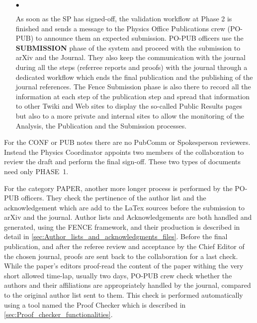 \begin{itemize}
    \item[\tiny$\bullet$]
    
As soon as the SP has signed-off, the validation workflow at Phase 2 is finished and sends a message to the Physics Office Publications crew (PO-PUB) to announce them an expected submission. PO-PUB officers use the \textbf{SUBMISSION} phase of the system and proceed with the submission to arXiv and the Journal. They also keep the communication with the journal during all the steps (referree reports and proofs) with the journal through a dedicated  workflow which ends  the final publication and the publishing of the journal references. The Fence Submission phase is also there to record all the information at each step of the publication step and spread that information to other Twiki and Web sites to display the so-called Public Results pages but also to a more private and internal sites to allow the monitoring of the Analysis, the Publication and the Submission processes.

\end{itemize}

For the CONF or PUB notes there are no PubComm or Spokesperson reviewers. Instead the Physics Coordinator appoints two members of the collaboration to review the draft and perform the final sign-off. These two types of documents need only PHASE~1.

For the category PAPER,  another more longer process is performed by the PO-PUB officers. They check the pertinence of the author list and the acknowledgement which are add to the LaTex sources before the submission to  arXiv and the journal. Author lists and Acknowledgements are both  handled and generated, using the FENCE framework, and their production is described in detail in \cref{sec:Author_lists_and_acknowledgments_files}. Before the final publication, and after the referee review and acceptance by the Chief Editor of the chosen journal, proofs are sent back to the collaboration for a last check.  While the paper's editors proof-read the content of the paper withing the very short allowed time-lap, usually two days, PO-PUB crew check whether the authors and their affiliations are appropriately handled by the journal, compared to the original author list sent to them. This check is performed automatically using a tool named  the Proof Checker which is described in \cref{sec:Proof_checker_functionalities}.